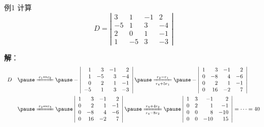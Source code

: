 \begin{frame}
  \begin{footnotesize}  
      \begin{exampleblock}{例1}
        计算
        $$
        D = \left|
        \begin{array}{rrrr}
          3   &  1  &  -1  &  2 \\
          -5  &  1  &   3  & -4 \\
          2   &  0  &   1  & -1 \\
          1   & -5  &   3  &  -3 
        \end{array}
        \right|
        $$
      \end{exampleblock}
      \pause
      \textbf{解}：
      $$
      \begin{array}{ll}
        D & \pause \xlongequal{c_1 \leftrightarrow c_2} \pause
        - \left|
        \begin{array}{rrrr}
          1  & 3   &  -1 &  2 \\
          1  & -5  &  3  & -4 \\
          0  & 2   &  1  & -1 \\
          -5  & 1   &  3  &  -3 
        \end{array}
        \right|
        \pause \xlongequal[r_4 + 5r_1]{r_2 - r_1}\pause
        - \left|
        \begin{array}{rrrr}
          1  & 3   &  -1 &  2 \\
          0  & -8  &  4  & -6 \\
          0  & 2   &  1  & -1 \\
          0  & 16  & -2  &  7
        \end{array}
        \right|\\[0.8cm]
        &\pause \xlongequal{r_2 \leftrightarrow r_3} \pause
        \left|
        \begin{array}{rrrr}
          1  & 3   &  -1 &  2 \\
          0  & 2   &  1  & -1 \\
          0  & -8  &  4  & -6 \\
          0  & 16  & -2  &  7
        \end{array}
        \right| \pause
        \xlongequal[ r_4 - 8r_2]{r_3 + 4r_2} \pause
        \left|
        \begin{array}{rrrr}
          1  & 3   &  -1 &  2 \\
          0  & 2   &  1  & -1 \\
          0  & 0   &  8  & -10 \\
          0  & 0   & -10 &  15
        \end{array}
        \right| = \cd = 40
      \end{array}
      $$
  \end{footnotesize}
\end{frame}

